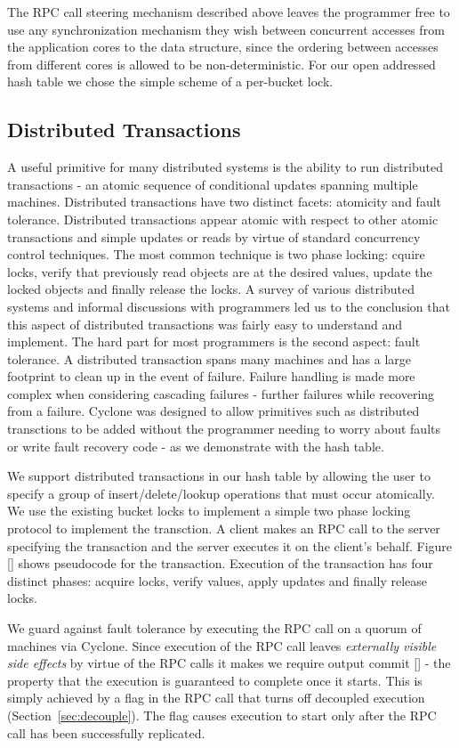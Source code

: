 \documentclass[twocolumn]{article}
\begin{document}
The RPC call steering mechanism described above leaves the programmer free to
use any synchronization mechanism they wish between concurrent accesses from the
application cores to the data structure, since the ordering between accesses
from different cores is allowed to be non-deterministic. For our open addressed
hash table we chose the simple scheme of a per-bucket lock.

\subsection{Distributed Transactions}
A useful primitive for many distributed systems is the ability to run
distributed transactions - an atomic sequence of conditional updates spanning
multiple machines. Distributed transactions have two distinct facets:
atomicity and fault tolerance. Distributed transactions appear atomic with
respect to other atomic transactions and simple updates or reads by virtue of
standard concurrency control techniques. The most common technique is two phase
locking: cquire locks, verify that previously read objects are at the desired
values, update the locked objects and finally release the locks. A survey of
various distributed systems and informal discussions with programmers led us to
the conclusion that this aspect of distributed transactions was fairly easy to
understand and implement. The hard part for most programmers is the second
aspect: fault tolerance. A distributed transaction spans many machines and has a
large footprint to clean up in the event of failure. Failure handling is made
more complex when considering cascading failures - further failures while
recovering from a failure. Cyclone was designed to allow primitives such as
distributed transctions to be added without the programmer needing to worry
about faults or write fault recovery code - as we demonstrate with the hash
table.

We support distributed transactions in our hash table by allowing the user to
specify a group of insert/delete/lookup operations that must occur
atomically. We use the existing bucket locks to implement a simple two phase
locking protocol to implement the transction. A client makes an RPC call to the
server specifying the transaction and the server executes it on the client's
behalf. Figure [] shows pseudocode for the transaction. Execution of the
transaction has four distinct phases: acquire locks, verify values, apply
updates and finally release locks.

We guard against fault tolerance by executing the RPC call on a quorum of
machines via Cyclone. Since execution of the RPC call leaves \emph{externally
  visible side effects} by virtue of the RPC calls it makes we require output
commit [] - the property that the execution is guaranteed to complete once it
starts. This is simply achieved by a flag in the RPC call that turns off
decoupled execution (Section~\ref{sec:decouple}). The flag causes execution to
start only after the RPC call has been successfully replicated.
\end{document}
